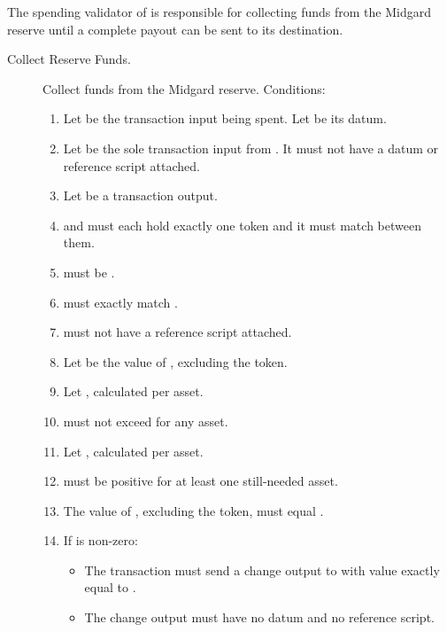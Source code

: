 \documentclass[../midgard.tex]{subfiles}
\begin{document}
The spending validator of  is responsible for collecting funds from the Midgard reserve until a complete payout can be sent to its destination.
\begin{description}
  \item[Collect Reserve Funds.] Collect funds from the Midgard reserve.
    Conditions:
    \begin{enumerate}
      \item Let  be the transaction input being spent.
        Let  be its datum.
      \item Let  be the sole transaction input from .
        It must not have a datum or reference script attached.
      \item Let  be a transaction output.
      \item {} and  must each hold exactly one  token and it must match between them.
      \item {} must be .
      \item {} must exactly match .
      \item {} must not have a reference script attached.
      \item Let  be the value of , excluding the  token.
      \item Let , calculated per asset.
      \item {} must not exceed  for any asset.
      \item Let , calculated per asset.
      \item {} must be positive for at least one still-needed asset.
      \item The value of , excluding the  token, must equal .
      \item If  is non-zero:
        \begin{itemize}
          \item The transaction must send a change output to  with value exactly equal to .
          \item The change output must have no datum and no reference script.

\end{itemize}
\end{enumerate}
\end{description}
\end{document}
